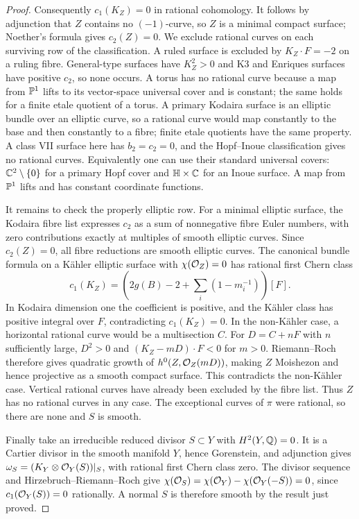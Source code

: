 \begin{proof}
Consequently $c_1(K_Z)=0$ in rational cohomology. It follows by adjunction that $Z$ contains no $(-1)$-curve, so $Z$ is a minimal compact surface; Noether's formula gives $c_2(Z)=0$. We exclude rational curves on each surviving row of the classification. A ruled surface is excluded by $K_Z\cdot F=-2$ on a ruling fibre. General-type surfaces have $K_Z^2>0$ and K3 and Enriques surfaces have positive $c_2$, so none occurs. A torus has no rational curve because a map from $\mathbb P^1$ lifts to its vector-space universal cover and is constant; the same holds for a finite etale quotient of a torus. A primary Kodaira surface is an elliptic bundle over an elliptic curve, so a rational curve would map constantly to the base and then constantly to a fibre; finite etale quotients have the same property. A class VII surface here has $b_2=c_2=0$, and the Hopf--Inoue classification gives no rational curves. Equivalently one can use their standard universal covers: $\mathbb C^2\setminus\{0\}$ for a primary Hopf cover and $\mathbb H\times\mathbb C$ for an Inoue surface. A map from $\mathbb P^1$ lifts and has constant coordinate functions.

It remains to check the properly elliptic row. For a minimal elliptic surface, the Kodaira fibre list expresses $c_2$ as a sum of nonnegative fibre Euler numbers, with zero contributions exactly at multiples of smooth elliptic curves. Since $c_2(Z)=0$, all fibre reductions are smooth elliptic curves. The canonical bundle formula on a Kähler elliptic surface with $\chi(\mathcal O_Z)=0$ has rational first Chern class
\[
 c_1(K_Z)=\left(2g(B)-2+\sum_i(1-m_i^{-1})\right)[F].
\]
In Kodaira dimension one the coefficient is positive, and the Kähler class has positive integral over $F$, contradicting $c_1(K_Z)=0$. In the non-Kähler case, a horizontal rational curve would be a multisection $C$. For $D=C+nF$ with $n$ sufficiently large, $D^2>0$ and $(K_Z-mD)\cdot F<0$ for $m>0$. Riemann--Roch therefore gives quadratic growth of $h^0(Z,\mathcal O_Z(mD))$, making $Z$ Moishezon and hence projective as a smooth compact surface. This contradicts the non-Kähler case. Vertical rational curves have already been excluded by the fibre list. Thus $Z$ has no rational curves in any case. The exceptional curves of $\pi$ were rational, so there are none and $S$ is smooth.

Finally take an irreducible reduced divisor $S\subset Y$ with $H^2(Y,\mathbb Q)=0$. It is a Cartier divisor in the smooth manifold $Y$, hence Gorenstein, and adjunction gives $\omega_S=(K_Y\otimes\mathcal O_Y(S))|_S$, with rational first Chern class zero. The divisor sequence and Hirzebruch--Riemann--Roch give
$\chi(\mathcal O_S)=\chi(\mathcal O_Y)-\chi(\mathcal O_Y(-S))=0$, since $c_1(\mathcal O_Y(S))=0$ rationally. A normal $S$ is therefore smooth by the result just proved.
\end{proof}


